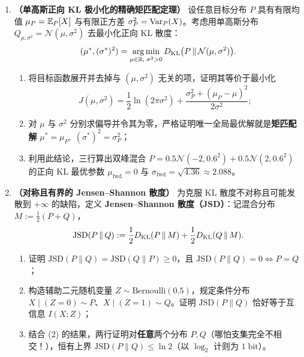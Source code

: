 \begin{enumerate}[label=\textbf{4.\arabic*}, leftmargin=2.4em, resume]
  \item \textbf{（单高斯正向 KL 极小化的精确矩匹配定理）} 设任意目标分布 $P$ 具有有限均值 $\mu_P = \mathbb{E}_P[X]$ 与有限正方差 $\sigma_P^2 = \operatorname{Var}_P(X)$。考虑用单高斯分布 $Q_{\mu,\sigma^2} = \mathcal{N}(\mu, \sigma^2)$ 去最小化正向 KL 散度：
  \[
    (\mu^*, (\sigma^*)^2) = \operatorname*{arg\,min}_{\mu \in \mathbb{R},\; \sigma^2 > 0} D_{\mathrm{KL}}\bigl(P \,\|\, \mathcal{N}(\mu, \sigma^2)\bigr).
  \]
  \begin{enumerate}[label=(\arabic*), leftmargin=1.8em]
    \item 将目标函数展开并去掉与 $(\mu, \sigma^2)$ 无关的项，证明其等价于最小化
    \[
      J(\mu, \sigma^2) = \frac{1}{2}\ln(2\pi \sigma^2) + \frac{\sigma_P^2 + (\mu_P - \mu)^2}{2\sigma^2};
    \]
    \item 对 $\mu$ 与 $\sigma^2$ 分别求偏导并令其为零，严格证明唯一全局最优解就是\textbf{矩匹配解} $\mu^* = \mu_P,\; (\sigma^*)^2 = \sigma_P^2$；
    \item 利用此结论，三行算出双峰混合 $P = 0.5\mathcal{N}(-2, 0.6^2) + 0.5\mathcal{N}(2, 0.6^2)$ 的正向 KL 最优参数 $\mu_{\mathrm{fwd}} = 0$ 与 $\sigma_{\mathrm{fwd}} = \sqrt{4.36} \approx 2.088$。
  \end{enumerate}

  \item \textbf{（对称且有界的 Jensen--Shannon 散度）} 为克服 KL 散度不对称且可能发散到 $+\infty$ 的缺陷，定义 \textbf{Jensen--Shannon 散度（JSD）}：记混合分布 $M := \frac{1}{2}(P + Q)$，
  \[
    \mathrm{JSD}(P \,\|\, Q) := \frac{1}{2}D_{\mathrm{KL}}(P \,\|\, M) + \frac{1}{2}D_{\mathrm{KL}}(Q \,\|\, M).
  \]
  \begin{enumerate}[label=(\arabic*), leftmargin=1.8em]
    \item 证明 $\mathrm{JSD}(P\|Q) = \mathrm{JSD}(Q\|P) \ge 0$，且 $\mathrm{JSD}(P\|Q) = 0 \iff P = Q$；
    \item 构造辅助二元随机变量 $Z \sim \mathrm{Bernoulli}(0.5)$，规定条件分布 $X \mid (Z=0) \sim P$、$X \mid (Z=1) \sim Q$。证明 $\mathrm{JSD}(P\|Q)$ 恰好等于互信息 $I(X; Z)$；
    \item 结合 (2) 的结果，两行证明对\textbf{任意}两个分布 $P, Q$（哪怕支集完全不相交！），恒有上界 $\mathrm{JSD}(P\|Q) \le \ln 2$（以 $\log_2$ 计则为 $1\;\text{bit}$）。
  \end{enumerate}
\end{enumerate}

